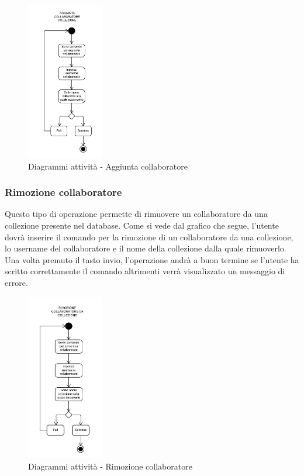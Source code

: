 \documentclass{scalatekids-article}
\begin{document}
\begin{figure}[H]
	\begin{center}
		\includegraphics[width=0.3\textwidth, keepaspectratio]{img/diagrammiAttivita/aggCollaboratore.jpeg}
		\caption*{Diagrammi attività - Aggiunta collaboratore}
	\end{center}
\end{figure}

\subsubsection{Rimozione collaboratore}
Questo tipo di operazione permette di rimuovere un collaboratore da una collezione presente nel database.
Come si vede dal grafico che segue, l'utente dovrà inserire il comando per la rimozione di un collaboratore da una collezione, lo username del collaboratore e il nome della collezione dalla quale rimuoverlo.
Una volta premuto il tasto invio, l'operazione andrà a buon termine se l'utente ha scritto correttamente il comando altrimenti verrà visualizzato un messaggio di errore.

\begin{figure}[H]
	\begin{center}
		\includegraphics[width=0.3\textwidth, keepaspectratio]{img/diagrammiAttivita/rimozioneCollaboratore.jpeg}
		\caption*{Diagrammi attività - Rimozione collaboratore}
	\end{center}
\end{figure}
\end{document}
